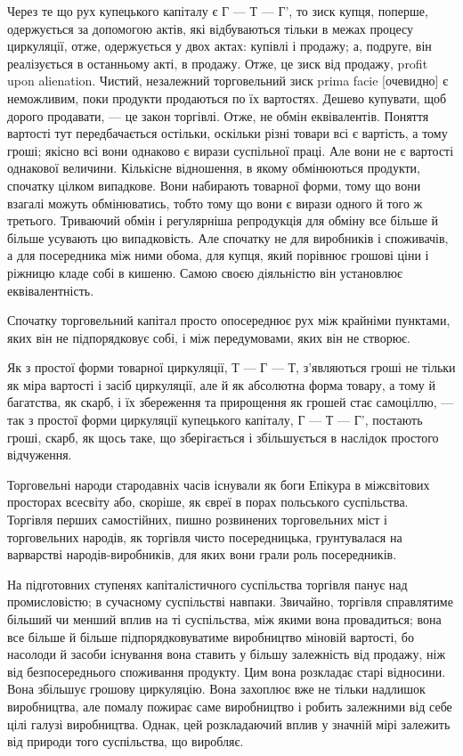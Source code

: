 Через те що рух купецького капіталу є Г — Т — Г', то зиск
купця, поперше, одержується за допомогою актів, які відбуваються
тільки в межах процесу циркуляції, отже, одержується
у двох актах: купівлі і продажу; а, подруге, він реалізується в
останньому акті, в продажу. Отже, це зиск від продажу, profit
upon alienation. Чистий, незалежний торговельний зиск prima
facie [очевидно] є неможливим, поки продукти продаються по їх
вартостях. Дешево купувати, щоб дорого продавати, — це закон
торгівлі. Отже, не обмін еквівалентів. Поняття вартості тут
передбачається остільки, оскільки різні товари всі є вартість,
а тому гроші; якісно всі вони однаково є вирази суспільної праці.
Але вони не є вартості однакової величини. Кількісне відношення,
в якому обмінюються продукти, спочатку цілком випадкове. Вони
набирають товарної форми, тому що вони взагалі можуть обмінюватись,
тобто тому що вони є вирази одного й того ж третього.
Триваючий обмін і регулярніша репродукція для обміну все більше
й більше усувають цю випадковість. Але спочатку не для виробників
і споживачів, а для посередника між ними обома, для
купця, який порівнює грошові ціни і ріжницю кладе собі в кишеню.
Самою своєю діяльністю він установлює еквівалентність.

Спочатку торговельний капітал просто опосереднює рух між
крайніми пунктами, яких він не підпорядковує собі, і між передумовами,
яких він не створює.

Як з простої форми товарної циркуляції, Т — Г — Т, з’являються
гроші не тільки як міра вартості і засіб циркуляції, але й як
абсолютна форма товару, а тому й багатства, як скарб, і їх збереження
та прирощення як грошей стає самоціллю, — так з простої
форми циркуляції купецького капіталу, Г — Т — Г', постають
гроші, скарб, як щось таке, що зберігається і збільшується в наслідок
простого відчуження.

Торговельні народи стародавніх часів існували як боги Епікура
в міжсвітових просторах всесвіту або, скоріше, як євреї в
порах польського суспільства. Торгівля перших самостійних,
пишно розвинених торговельних міст і торговельних народів, як
торгівля чисто посередницька, грунтувалася на варварстві народів-виробників,
для яких вони грали роль посередників.

На підготовних ступенях капіталістичного суспільства торгівля
панує над промисловістю; в сучасному суспільстві навпаки. Звичайно,
торгівля справлятиме більший чи менший вплив на ті суспільства,
між якими вона провадиться; вона все більше й більше
підпорядковуватиме виробництво міновій вартості, бо насолоди
й засоби існування вона ставить у більшу залежність від продажу,
ніж від безпосереднього споживання продукту. Цим вона розкладає
старі відносини. Вона збільшує грошову циркуляцію. Вона захоплює
вже не тільки надлишок виробництва, але помалу пожирає
саме виробництво і робить залежними від себе цілі галузі
виробництва. Однак, цей розкладаючий вплив у значній мірі
залежить від природи того суспільства, що виробляє.
